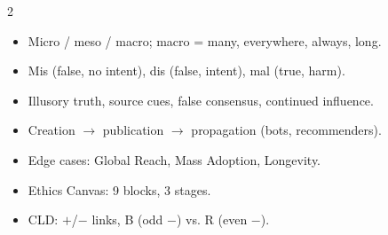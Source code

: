 \documentclass[a4paper,9pt]{extarticle}
\begin{document}
\begin{multicols}{2}
\begin{summary}

\begin{itemize}

\item Micro / meso / macro; macro = many, everywhere, always, long.

\item Mis (false, no intent), dis (false, intent), mal (true, harm).

\item Illusory truth, source cues, false consensus, continued influence.

\item Creation $\rightarrow$ publication $\rightarrow$ propagation (bots, recommenders).

\item Edge cases: Global Reach, Mass Adoption, Longevity.

\item Ethics Canvas: 9 blocks, 3 stages.

\item CLD: $+$/$-$ links, B (odd $-$) vs. R (even $-$).

\end{itemize}

\end{summary}


\end{multicols}
\end{document}
